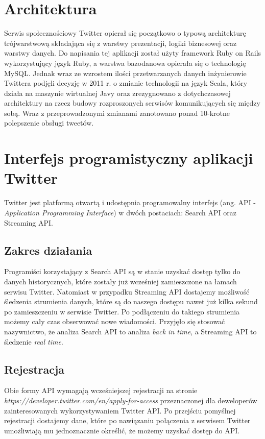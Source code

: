 \section{Architektura}
Serwis społecznościowy Twitter opierał się początkowo o typową architekturę trójwarstwową składająca się z warstwy prezentacji, logiki biznesowej oraz warstwy danych. Do napisania tej aplikacji został użyty framework Ruby on Rails wykorzystujący język Ruby, a warstwa bazodanowa opierała się o technologię MySQL. Jednak wraz ze wzrostem ilości przetwarzanych danych inżynierowie Twittera podjęli decyzję w 2011 r. o zmianie technologii na język Scala, który działa na maszynie wirtualnej Javy oraz zrezygnowano z dotychczasowej architektury na rzecz budowy rozproszonych serwisów komunikujących się między sobą. Wraz z przeprowadzonymi zmianami zanotowano ponad 10-krotne polepszenie obsługi tweetów.

\section{Interfejs programistyczny aplikacji Twitter}
Twitter jest platformą otwartą i udostępnia programowalny interfejs (ang. API - \textit{Application Programming Interface}) w dwóch postaciach: Search API oraz Streaming API.

\subsection{Zakres działania}
Programiści korzystający z Search API są w stanie uzyskać dostęp tylko do danych historycznych, które zostały już wcześniej zamieszczone na łamach serwisu Twitter. Natomiast w przypadku Streaming API dostajemy możliwość śledzenia strumienia danych, które są do naszego dostępu nawet już kilka sekund po zamieszczeniu w serwisie Twitter. Po podłączeniu do takiego strumienia możemy cały czas obserwować nowe wiadomości. Przyjęło się stosować nazywnictwo, że analiza Search API to analiza \textit{back in time}, a Streaming API to śledzenie \textit{real time}.

\subsection{Rejestracja}
Obie formy API wymagają wcześniejszej rejestracji na stronie \textit{https://developer.twitter.com/en/apply-for-access} przeznaczonej dla deweloperów zainteresowanych wykorzystywaniem Twitter API. Po przejściu pomyślnej rejestracji dostajemy dane, które po nawiązaniu połączenia z serwisem Twitter umożliwiają mu jednoznacznie określić, że możemy uzyskać dostęp do API.

